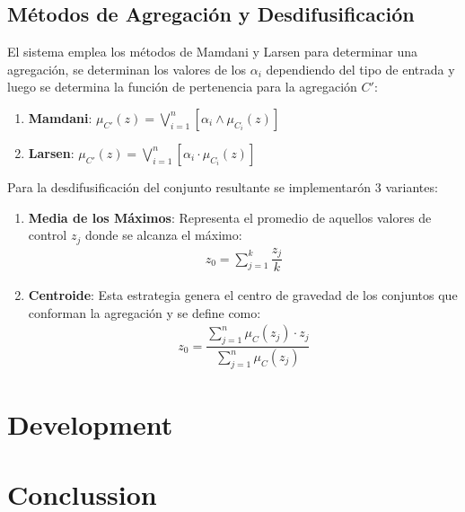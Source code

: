 \documentclass[a4paper,10pt,twocolumn]{article}
\begin{document}
\subsection*{M\'etodos de Agregaci\'on y Desdifusificaci\'on}

El sistema emplea los m\'etodos de Mamdani y Larsen para determinar una agregaci\'on, se determinan los valores de los $\alpha_i$ dependiendo del tipo de entrada y luego se determina la funci\'on de pertenencia para la agregaci\'on $C'$:
	\begin{enumerate}
		\item[] \textbf{Mamdani}: $\mu_{C'} (z) = \bigvee_{i=1}^{n} \left[ \alpha_i  \wedge \mu_{C_i} (z) \right]$ 
		
		\item[] \textbf{Larsen}: $\mu_{C'} (z) = \bigvee_{i=1}^{n} \left[ \alpha_i \cdot \mu_{C_i} (z) \right]$
	\end{enumerate}

Para la desdifusificaci\'on del conjunto resultante se implementar\'on 3 variantes:

	\begin{enumerate}
		\item[] \textbf{Media de los M\'aximos}: Representa el promedio de aquellos valores de control $z_j$ donde se alcanza el m\'aximo:
			\begin{align}
				z_0 = \sum_{j=1}^{k} \dfrac{z_j}{k}
			\end{align}
		
		\item[] \textbf{Centroide}: Esta estrategia genera el centro de gravedad de los conjuntos que conforman la agregaci\'on y se define como:
			\begin{align}
				z_0 = \dfrac{\sum_{j=1}^{n} \mu_{C} (z_j) \cdot z_j}{\sum_{j=1}^{n} \mu_{C} (z_j)}
			\end{align}
			 
	\end{enumerate}

\section*{Development}\label{sec:dev}
  
\lipsum[6-8]

\section*{Conclussion}\label{sec:con}

\lipsum[9-11]

\begin{thebibliography}{9}
	
\end{thebibliography}

\label{end}
\end{document}
